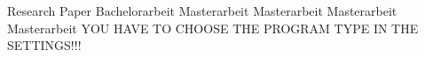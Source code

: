\begin{center}

\vspace{1cm}

\begin{minipage}[t][5cm][s]{\textwidth}%
\centering
\Huge{{\color{FH2}{\fontsize{24}{30} \selectfont \workTitle\\}}}
\vspace{0.5cm}
\LARGE{{\color{FH2}{\fontsize{16}{24} \selectfont \subTitle\\}}}
\end{minipage}

\vspace{1cm}


\ifnum{}
\else{}
\else{}
\fi\fi{} 
   	\LARGE{Research Paper}
\else
	\ifnum{}
	\else{}
	\else{}
\fi\fi{}
	\LARGE{Bachelorarbeit}
\else
	\ifUseMasterInteractiveTechnologies
		\LARGE{Masterarbeit}
	\else
	\ifUseMasterDigitalDesign
		\LARGE{Masterarbeit}
	\else
    \ifUseMasterDigitalMediaProduction
		\LARGE{Masterarbeit}
	\else
	\ifUseMasterDigitalHealthCare
		\LARGE{Masterarbeit}
    \else
        \LARGE{YOU HAVE TO CHOOSE THE PROGRAM TYPE IN THE SETTINGS!!!}
    \fi\fi\fi\fi
\fi\fi



\end{center}
